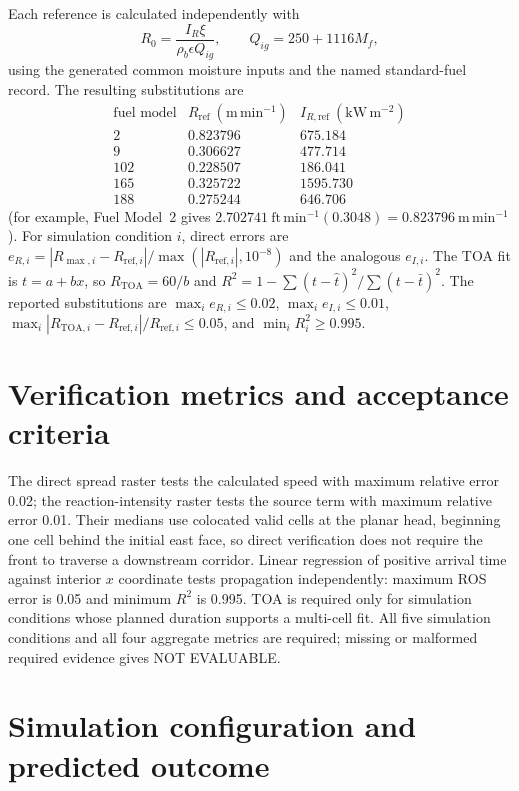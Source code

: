 Each reference is calculated independently with
\[
 R_0=\frac{I_R\xi}{\rho_b\epsilon Q_{ig}},\qquad
 Q_{ig}=250+1116M_f,
\]
using the generated common moisture inputs and the named standard-fuel
record.  The resulting substitutions are
\[
\begin{array}{c|cc}
\text{fuel model}&R_{\mathrm{ref}}~(\mathrm{m\,min^{-1}})
&I_{R,\mathrm{ref}}~(\mathrm{kW\,m^{-2}})\\\hline
2&0.823796&675.184\\
9&0.306627&477.714\\
102&0.228507&186.041\\
165&0.325722&1595.730\\
188&0.275244&646.706
\end{array}
\]
(for example, Fuel Model~2 gives
\(2.702741~\mathrm{ft\,min^{-1}}(0.3048)=0.823796~\mathrm{m\,min^{-1}}\)).
For simulation condition \(i\), direct errors are
\(e_{R,i}=|R_{\max,i}-R_{\mathrm{ref},i}|/
\max(|R_{\mathrm{ref},i}|,10^{-8})\) and the analogous \(e_{I,i}\).
The TOA fit is \(t=a+bx\), so \(R_{\mathrm{TOA}}=60/b\) and
\(R^2=1-\sum(t-\hat t)^2/\sum(t-\bar t)^2\).
The reported substitutions are
\(\max_i e_{R,i}\leq0.02\), \(\max_i e_{I,i}\leq0.01\),
\(\max_i|R_{\mathrm{TOA},i}-R_{\mathrm{ref},i}|/
R_{\mathrm{ref},i}\leq0.05\), and \(\min_iR_i^2\geq0.995\).

\section{Verification metrics and acceptance criteria}
The direct spread raster tests the calculated speed with maximum relative error 0.02; the reaction-intensity raster tests the source term with maximum relative error 0.01.  Their medians use colocated valid cells at the planar head, beginning one cell behind the initial east face, so direct verification does not require the front to traverse a downstream corridor. Linear regression of positive arrival time against interior $x$ coordinate tests propagation independently: maximum ROS error is 0.05 and minimum $R^2$ is 0.995. TOA is required only for simulation conditions whose planned duration supports a multi-cell fit. All five simulation conditions and all four aggregate metrics are required; missing or malformed required evidence gives NOT EVALUABLE.

\section{Simulation configuration and predicted outcome}

